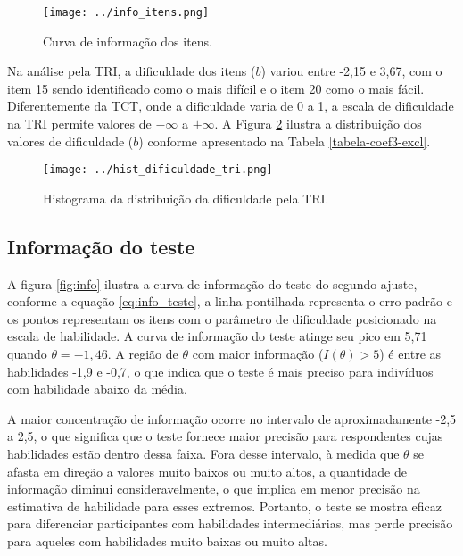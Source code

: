 \clearpage
\begin{figure}[H]
	\centering
	\caption{Curva de informação dos itens.}
	\texttt{[image: ../info\_itens.png]}
	\parbox{\textwidth}{
		\centering %
	}
	\label{fig:info_itens}
\end{figure}

Na análise pela TRI, a dificuldade dos itens ($b$) variou entre -2,15 e 3,67, com o item 15 sendo identificado como o mais difícil e o item 20 como o mais fácil. Diferentemente da TCT, onde a dificuldade varia de 0 a 1, a escala de dificuldade na TRI permite valores de $- \infty$ a $+ \infty$. A Figura \ref{fig:dificuldade_tri} ilustra a distribuição dos valores de dificuldade ($b$) conforme apresentado na Tabela \ref{tabela-coef3-excl}.

\begin{figure}[H]
	\centering
	\caption{Histograma da distribuição da dificuldade pela TRI.}
	\texttt{[image: ../hist\_dificuldade\_tri.png]}
	\parbox{\textwidth}{
		\centering %
	}	
	\label{fig:dificuldade_tri}
\end{figure}


\subsection{Informação do teste}
\thispagestyle{nocontent}
A figura \ref{fig:info} ilustra a curva de informação do teste do segundo ajuste, conforme a equação \ref{eq:info_teste}, a linha pontilhada representa o erro padrão e os pontos representam os itens com o parâmetro de dificuldade posicionado na escala de habilidade. A curva de informação do teste atinge seu pico em 5,71 quando $\theta = -1,46$. A região de $\theta$ com maior informação ($I(\theta) > 5$) é entre as habilidades -1,9 e -0,7, o que indica que o teste é mais preciso para indivíduos com habilidade abaixo da média. 

A maior concentração de informação ocorre no intervalo de aproximadamente -2,5 a 2,5, o que significa que o teste fornece maior precisão para respondentes cujas habilidades estão dentro dessa faixa. Fora desse intervalo, à medida que $\theta$ se afasta em direção a valores muito baixos ou muito altos, a quantidade de informação diminui consideravelmente, o que implica em menor precisão na estimativa de habilidade para esses extremos. Portanto, o teste se mostra eficaz para diferenciar participantes com habilidades intermediárias, mas perde precisão para aqueles com habilidades muito baixas ou muito altas.

